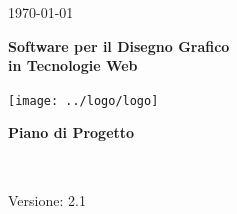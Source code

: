 \usepackage{multirow}
\title{\TITOLODOC}
\author{Dal Bosco Davide}



\renewcommand{\insertversion}{2.1} %
\renewcommand{\TITOLODOC}{Piano di Progetto} %
\renewcommand{\glosspath}{.\glossario} %

\begin{titlepage}
\begin{center}
	\begin{Large}	\today \end{Large}
\end{center}

\vspace{20pt}

\begin{center}
	\begin{Huge}
				\textbf{\ajax}
	\end{Huge}
\end{center}			

\begin{center}
	\begin{large}
				\textbf{Software per il Disegno Grafico\\ in Tecnologie Web}
	\end{large}
\end{center}			

\vspace{20pt}

\begin{center}
\texttt{[image: ../logo/logo]}
\end{center}

\vspace{170pt}
\begin{center} %
	\begin{Huge}
				\textbf{\TITOLODOC}
	\end{Huge}
			\\
\end{center}
\vspace{190pt}
\begin{center}
Versione: \insertversion
\end{center}
\end{titlepage}

\newpage

